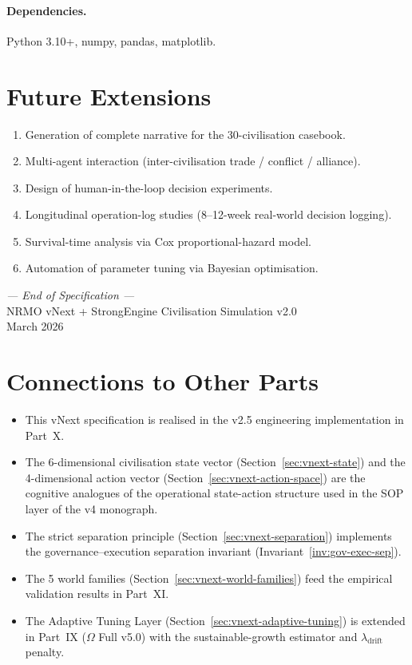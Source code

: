 \paragraph{Dependencies.}
Python 3.10+, numpy, pandas, matplotlib.

\section{Future Extensions}
\label{sec:vnext-future-extensions}

\begin{enumerate}
\item Generation of complete narrative for the 30-civilisation
casebook.
\item Multi-agent interaction (inter-civilisation trade /
conflict / alliance).
\item Design of human-in-the-loop decision experiments.
\item Longitudinal operation-log studies (8--12-week real-world
decision logging).
\item Survival-time analysis via Cox proportional-hazard model.
\item Automation of parameter tuning via Bayesian optimisation.
\end{enumerate}

\medskip

\centering
\textit{--- End of Specification ---}\\
NRMO vNext + StrongEngine Civilisation Simulation v2.0\\
March 2026

\section*{Connections to Other Parts}

\begin{itemize}
\item This vNext specification is realised in the v2.5 engineering
implementation in Part~X.
\item The 6-dimensional civilisation state vector
(Section~\ref{sec:vnext-state}) and the 4-dimensional action vector
(Section~\ref{sec:vnext-action-space}) are the cognitive analogues
of the operational state-action structure used in the SOP layer
of the v4 monograph.
\item The strict separation principle
(Section~\ref{sec:vnext-separation}) implements the
governance--execution separation invariant
(Invariant~\ref{inv:gov-exec-sep}).
\item The 5 world families
(Section~\ref{sec:vnext-world-families}) feed the empirical
validation results in Part~XI.
\item The Adaptive Tuning Layer
(Section~\ref{sec:vnext-adaptive-tuning}) is extended in Part~IX
($\Omega$ Full v5.0) with the sustainable-growth estimator and
$\lambda_{\mathrm{drift}}$ penalty.
\end{itemize}
